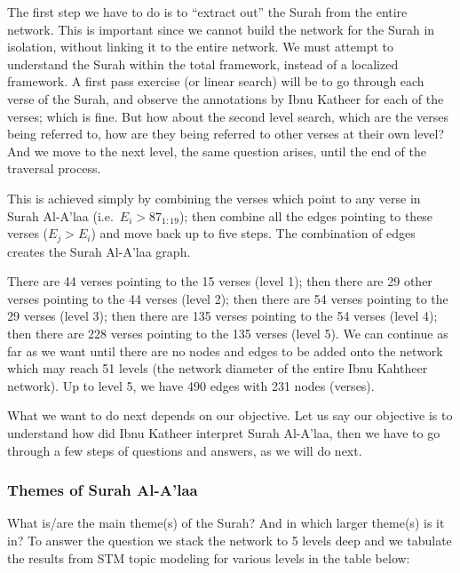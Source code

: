 \documentclass[
]{article}
\begin{document}
The first step we have to do is to ``extract out'' the Surah from the entire network. This is important since we cannot build the network for the Surah in isolation, without linking it to the entire network. We must attempt to understand the Surah within the total framework, instead of a localized framework. A first pass exercise (or linear search) will be to go through each verse of the Surah, and observe the annotations by Ibnu Katheer for each of the verses; which is fine. But how about the second level search, which are the verses being referred to, how are they being referred to other verses at their own level? And we move to the next level, the same question arises, until the end of the traversal process.

This is achieved simply by combining the verses which point to any verse in Surah Al-A'laa (i.e.~\(E_i > 87_{1:19}\)); then combine all the edges pointing to these verses (\(E_j > E_i\)) and move back up to five steps. The combination of edges creates the Surah Al-A'laa graph.

There are 44 verses pointing to the 15 verses (level 1); then there are 29 other verses pointing to the 44 verses (level 2); then there are 54 verses pointing to the 29 verses (level 3); then there are 135 verses pointing to the 54 verses (level 4); then there are 228 verses pointing to the 135 verses (level 5). We can continue as far as we want until there are no nodes and edges to be added onto the network which may reach 51 levels (the network diameter of the entire Ibnu Kahtheer network). Up to level 5, we have 490 edges with 231 nodes (verses).

What we want to do next depends on our objective. Let us say our objective is to understand how did Ibnu Katheer interpret Surah Al-A'laa, then we have to go through a few steps of questions and answers, as we will do next.

\hypertarget{themes-of-surah-al-alaa}{%
\subsubsection{Themes of Surah Al-A'laa}\label{themes-of-surah-al-alaa}}

What is/are the main theme(s) of the Surah? And in which larger theme(s) is it in? To answer the question we stack the network to 5 levels deep and we tabulate the results from STM topic modeling for various levels in the table below:
\end{document}
